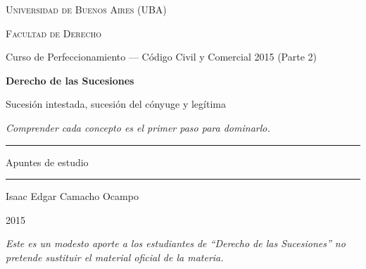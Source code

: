 \documentclass[12pt,oneside]{book}
\newcommand{\universidad}{Universidad de Buenos Aires (UBA)}
\newcommand{\facultad}{Facultad de Derecho}
\newcommand{\curso}{Curso de Perfeccionamiento --- Código Civil y Comercial 2015 (Parte 2)}
\newcommand{\materia}{Derecho de las Sucesiones}
\newcommand{\titulo}{Sucesión intestada, sucesión del cónyuge y legítima}
\newcommand{\autor}{Isaac Edgar Camacho Ocampo}
\newcommand{\anio}{2015}
\begin{document}
\begin{titlepage}

\thispagestyle{empty}

\begin{center}

\vspace*{1cm}

{\large \textsc{\universidad}}

\vspace{0.2cm}

{\large \textsc{\facultad}}

\vspace{0.2cm}

{\large \curso}

\vspace{3cm}

{\Huge \textbf{\materia}}

\vspace{1cm}

{\LARGE \titulo}

\vspace{0.8cm}

\textit{Comprender cada concepto es el primer paso para dominarlo.}

\vspace{1.2cm}

\rule{0.70\textwidth}{0.5pt}

\vspace{0.5cm}

{\large Apuntes de estudio}

\vspace{0.5cm}

\rule{0.70\textwidth}{0.5pt}

\vfill

{\large \autor}

\vspace{0.3cm}

{\large \anio}

\end{center}

\vfill

\begin{flushleft}
\textit{Este es un modesto aporte a los estudiantes de ``Derecho de las Sucesiones'' no pretende sustituir el material oficial de la materia.}
\end{flushleft}

\end{titlepage}
\end{document}

